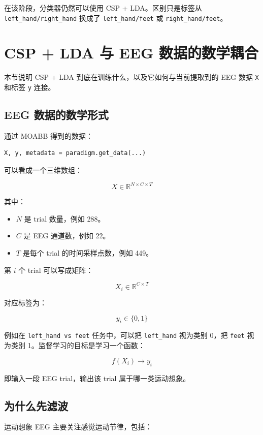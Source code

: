 \documentclass[UTF8,a4paper,12pt]{ctexart}
\begin{document}
在该阶段，分类器仍然可以使用 CSP + LDA。区别只是标签从 \texttt{left\_hand/right\_hand} 换成了 \texttt{left\_hand/feet} 或 \texttt{right\_hand/feet}。

\section{CSP + LDA 与 EEG 数据的数学耦合}

本节说明 CSP + LDA 到底在训练什么，以及它如何与当前提取到的 EEG 数据 \texttt{X} 和标签 \texttt{y} 连接。

\subsection{EEG 数据的数学形式}

通过 MOABB 得到的数据：

\begin{lstlisting}[language=Python]
X, y, metadata = paradigm.get_data(...)
\end{lstlisting}

可以看成一个三维数组：

\[
X \in \mathbb{R}^{N \times C \times T}
\]

其中：

\begin{itemize}
  \item \(N\) 是 trial 数量，例如 288。
  \item \(C\) 是 EEG 通道数，例如 22。
  \item \(T\) 是每个 trial 的时间采样点数，例如 449。
\end{itemize}

第 \(i\) 个 trial 可以写成矩阵：

\[
X_i \in \mathbb{R}^{C \times T}
\]

对应标签为：

\[
y_i \in \{0, 1\}
\]

例如在 \texttt{left\_hand vs feet} 任务中，可以把 \texttt{left\_hand} 视为类别 0，把 \texttt{feet} 视为类别 1。监督学习的目标是学习一个函数：

\[
f(X_i) \rightarrow y_i
\]

即输入一段 EEG trial，输出该 trial 属于哪一类运动想象。

\subsection{为什么先滤波}

运动想象 EEG 主要关注感觉运动节律，包括：
\end{document}
